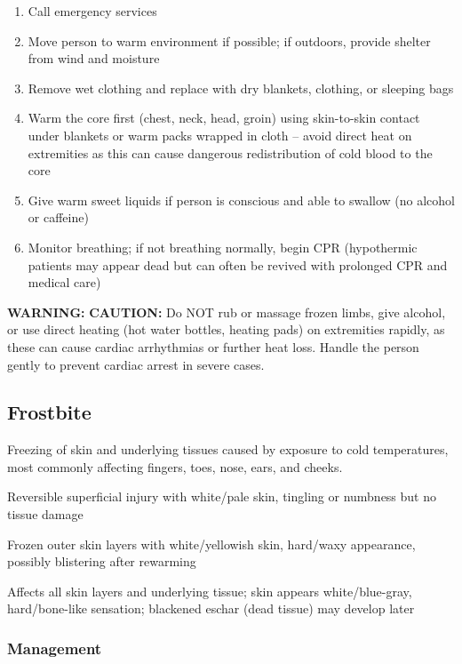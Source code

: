\begin{enumerate}[leftmargin=*]
\item Call emergency services
\item Move person to warm environment if possible; if outdoors, provide shelter from wind and moisture
\item Remove wet clothing and replace with dry blankets, clothing, or sleeping bags
\item Warm the core first (chest, neck, head, groin) using skin-to-skin contact under blankets or warm packs wrapped in cloth -- avoid direct heat on extremities as this can cause dangerous redistribution of cold blood to the core
\item Give warm sweet liquids if person is conscious and able to swallow (no alcohol or caffeine)
\item Monitor breathing; if not breathing normally, begin CPR (hypothermic patients may appear dead but can often be revived with prolonged CPR and medical care)
\end{enumerate}
\textbf{WARNING:} \textbf{CAUTION:} Do NOT rub or massage frozen limbs, give alcohol, or use direct heating (hot water bottles, heating pads) on extremities rapidly, as these can cause cardiac arrhythmias or further heat loss. Handle the person gently to prevent cardiac arrest in severe cases.

\subsection{Frostbite}

Freezing of skin and underlying tissues caused by exposure to cold temperatures, most commonly affecting fingers, toes, nose, ears, and cheeks.

\begin{description}[leftmargin=!]
  \item[Frostnip:] Reversible superficial injury with white/pale skin, tingling or numbness but no tissue damage
  \item[Superficial Frostbite:] Frozen outer skin layers with white/yellowish skin, hard/waxy appearance, possibly blistering after rewarming
  \item[Deep Frostbite:] Affects all skin layers and underlying tissue; skin appears white/blue-gray, hard/bone-like sensation; blackened eschar (dead tissue) may develop later
\end{description}

\subsubsection{Management}

